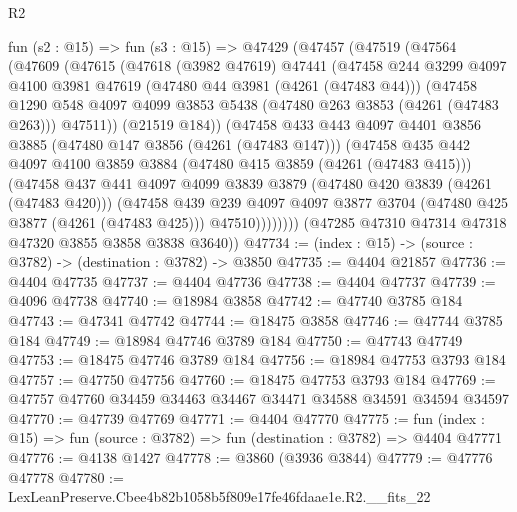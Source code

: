 \begin{lexlean}{R2}
\begin{coremodule}
  fun (s2 : @15) =>
  fun (s3 : @15) =>
  @47429
    (@47457
      (@47519
        (@47564
          (@47609
            (@47615
              (@47618
                (@3982 @47619)
                @47441
                (@47458
                  @244
                  @3299
                  @4097
                  @4100
                  @3981
                  @47619
                  (@47480 @44 @3981 (@4261 (@47483 @44)))
                  (@47458
                    @1290
                    @548
                    @4097
                    @4099
                    @3853
                    @5438
                    (@47480 @263 @3853 (@4261 (@47483 @263)))
                    @47511))
                (@21519 @184))
              (@47458
                @433
                @443
                @4097
                @4401
                @3856
                @3885
                (@47480 @147 @3856 (@4261 (@47483 @147)))
                (@47458
                  @435
                  @442
                  @4097
                  @4100
                  @3859
                  @3884
                  (@47480 @415 @3859 (@4261 (@47483 @415)))
                  (@47458
                    @437
                    @441
                    @4097
                    @4099
                    @3839
                    @3879
                    (@47480 @420 @3839 (@4261 (@47483 @420)))
                    (@47458
                      @439
                      @239
                      @4097
                      @4097
                      @3877
                      @3704
                      (@47480 @425 @3877 (@4261 (@47483 @425)))
                      @47510))))))))
      (@47285 @47310 @47314 @47318 @47320 @3855 @3858 @3838 @3640))
@47734 := (index : @15) -> (source : @3782) -> (destination : @3782) -> @3850
@47735 := @4404 @21857
@47736 := @4404 @47735
@47737 := @4404 @47736
@47738 := @4404 @47737
@47739 := @4096 @47738
@47740 := @18984 @3858
@47742 := @47740 @3785 @184
@47743 := @47341 @47742
@47744 := @18475 @3858
@47746 := @47744 @3785 @184
@47749 := @18984 @47746 @3789 @184
@47750 := @47743 @47749
@47753 := @18475 @47746 @3789 @184
@47756 := @18984 @47753 @3793 @184
@47757 := @47750 @47756
@47760 := @18475 @47753 @3793 @184
@47769 := @47757 @47760 @34459 @34463 @34467 @34471 @34588 @34591 @34594 @34597
@47770 := @47739 @47769
@47771 := @4404 @47770
@47775 := fun (index : @15) => fun (source : @3782) => fun (destination : @3782) => @4404 @47771
@47776 := @4138 @1427
@47778 := @3860 (@3936 @3844)
@47779 := @47776 @47778
@47780 := LexLeanPreserve.Cbee4b82b1058b5f809e17fe46fdaae1e.R2.__fits_22

\end{coremodule}
\end{lexlean}
